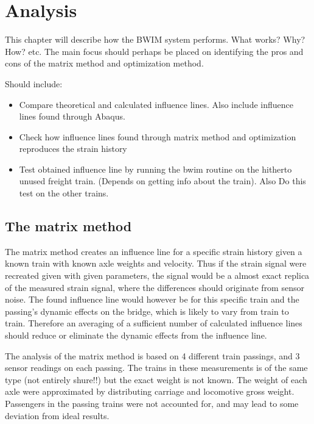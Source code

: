 \section{Analysis}

This chapter will describe how the BWIM system performs. What works? Why? How? etc.
The main focus should perhaps be placed on identifying the pros and cons of the matrix method and optimization method. 

Should include:
\begin{itemize}
\item Compare theoretical and calculated influence lines. Also include influence lines found through Abaqus.
\item Check how influence lines found through matrix method and optimization reproduces the strain history
\item Test obtained influence line by running the bwim routine on the hitherto unused freight train. (Depends on getting info about the train). Also Do this test on the other trains.
\end{itemize}

\subsection{The matrix method}
The matrix method creates an influence line for a specific strain history given a known train with known axle weights and velocity. Thus if the strain signal were recreated given with given parameters, the signal would be a almost exact replica of the measured strain signal, where the differences should originate from sensor noise. The found influence line would however be for this specific train and the passing's dynamic effects on the bridge, which is likely to vary from train to train. Therefore an averaging of a sufficient number of calculated influence lines should reduce or eliminate the dynamic effects from the influence line.

The analysis of the matrix method is based on 4 different train passings, and 3 sensor readings on each passing. The trains in these measurements is of the same type (not entirely shure!!) but the exact weight is not known. The weight of each axle were approximated by distributing carriage and locomotive gross weight. Passengers in the passing trains were not accounted for, and may lead to some deviation from ideal results. 

